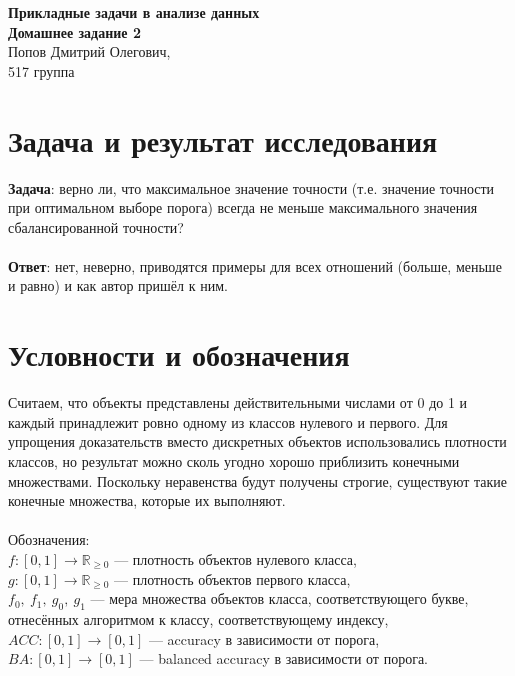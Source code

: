 \documentclass{article}
\begin{document}
\sloppy
\fontsize{12}{16}\selectfont

\begin{titlepage}
\begin{center}

    \bigskip

    \bigskip
    \bigskip
    \bigskip

    \textsf{\large\bfseries
        Прикладные задачи в анализе данных\\[25mm]
        Домашнее задание 2\\
    }
\vspace{\fill}
Попов Дмитрий Олегович,\\
517 группа
\vspace{\fill}
\vspace{\fill}
\vspace{\fill}
\bigskip
\bigskip
\bigskip

\end{center}
\end{titlepage}

\newpage
\section{Задача и результат исследования}
\textbf{Задача}: верно ли, что максимальное значение точности (т.е. значение точности при оптимальном выборе порога) всегда не меньше максимального значения сбалансированной точности?\\
\\
\textbf{Ответ}: нет, неверно, приводятся примеры для всех отношений (больше, меньше и равно) и как автор пришёл к ним.
\section{Условности и обозначения}
Считаем, что объекты представлены действительными числами от 0 до 1 и каждый принадлежит ровно одному из классов нулевого и первого. Для упрощения доказательств вместо дискретных объектов использовались плотности классов, но результат можно сколь угодно хорошо приблизить конечными множествами. Поскольку неравенства будут получены строгие, существуют такие конечные множества, которые их выполняют.\\
\\
Обозначения:\\
$f : [0, 1] \rightarrow \mathbb{R}_{\ge 0}$ --- плотность объектов нулевого класса,\\
$g : [0, 1] \rightarrow \mathbb{R}_{\ge 0}$ --- плотность объектов первого класса,\\
$f_0,~ f_1,~ g_0,~ g_1$ --- мера множества объектов класса, соответствующего букве, отнесённых алгоритмом к классу, соответствующему индексу,\\
$ACC : [0, 1] \rightarrow [0, 1]$ --- accuracy в зависимости от порога,\\
$BA : [0, 1] \rightarrow [0, 1]$ --- balanced accuracy в зависимости от порога.
\end{document}
